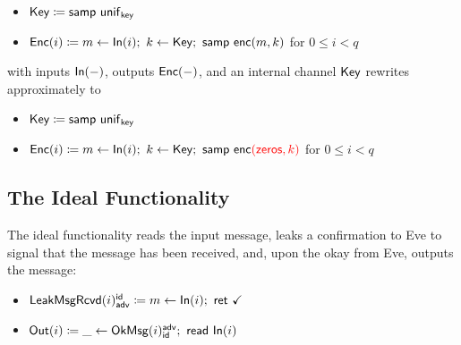 \begin{itemize}
\item $\mathsf{Key} \coloneqq \mathsf{samp} \ \mathsf{unif}_{\mathsf{key}}$
\item $\mathsf{Enc}(i) \coloneqq m \leftarrow \mathsf{In}(i); \ k \leftarrow \mathsf{Key}; \ \mathsf{samp} \ \mathsf{enc}(m,k)$ for $0 \leq i < q$
\end{itemize}
with inputs $\mathsf{In}(-)$, outputs $\mathsf{Enc}(-)$, and an internal channel $\mathsf{Key}$ rewrites approximately to
\begin{itemize}
\item $\mathsf{Key} \coloneqq \mathsf{samp} \ \mathsf{unif}_{\mathsf{key}}$
\item $\mathsf{Enc}(i) \coloneqq m \leftarrow \mathsf{In}(i); \ k \leftarrow \mathsf{Key}; \ \mathsf{samp} \ \mathsf{enc}{\color{red} (\mathsf{zeros}, k)}$ for $0 \leq i < q$
\end{itemize}

\subsection{The Ideal Functionality}
The ideal functionality reads the input message, leaks a confirmation to Eve to signal that the message has been received, and, upon the okay from Eve, outputs the message:
\begin{itemize}
\item $\mathsf{LeakMsgRcvd}(i)^{\mathsf{id}}_{\mathsf{adv}} \coloneqq m \leftarrow \mathsf{In}(i); \ \mathsf{ret} \ \checkmark$
\item $\mathsf{Out}(i) \coloneqq \_ \leftarrow \mathsf{OkMsg}(i)^{\mathsf{adv}}_{\mathsf{id}}; \ \mathsf{read} \ \mathsf{In}(i)$
\end{itemize}

